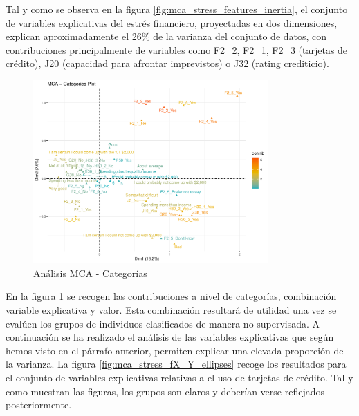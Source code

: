 \documentclass[a4paper, 11pt]{article}
\begin{document}
Tal y como se observa en la figura \ref{fig:mca_stress_features_inertia}, el conjunto de
variables explicativas del estrés financiero, proyectadas en dos dimensiones, explican
aproximadamente el 26\% de la varianza del conjunto de datos, con contribuciones 
principalmente de variables como F2\_2, F2\_1, F2\_3 (tarjetas de crédito), J20 (capacidad
para afrontar imprevistos) o J32 (rating crediticio).

\begin{figure}[ht]
    \centering
    \includegraphics[width=0.8\textwidth]{images/mca_stress_categories.pdf} 
    \caption{Análisis MCA - Categorías}
    \label{fig:mca_stress_categories}
\end{figure}

En la figura \ref{fig:mca_stress_categories} se recogen las contribuciones a nivel 
de categorías, combinación variable explicativa y valor. Esta combinación resultará
de utilidad una vez se evalúen los grupos de individuos clasificados de manera no 
supervisada. A continuación se ha realizado el análisis de las variables explicativas 
que según hemos visto en el párrafo anterior, permiten explicar una elevada proporción
de la varianza. La figura \ref{fig:mca_stress_fX_Y_ellipses} recoge los resultados para
el conjunto de variables explicativas relativas a el uso de tarjetas de crédito. Tal
y como muestran las figuras, los grupos son claros y deberían verse reflejados posteriormente.
\end{document}

